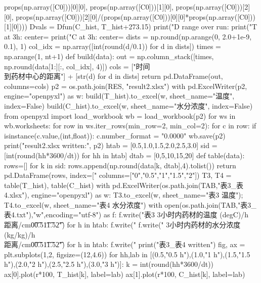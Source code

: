 \begin{codelisting}
    props(np.array([C0]))[0][0], props(np.array([C0]))[1][0], props(np.array([C0]))[2][0],
    props(np.array([C0]))[2][0]/(props(np.array([C0]))[0][0]*props(np.array([C0]))[1][0])))
Dvals = Dfun(C_hist, T_hist+273.15)
print("D range over run: %
print("T at 3h: center=%
print("C at 3h: center=%
dists = np.round(np.arange(0, 2.0+1e-9, 0.1), 1)
col_idx = np.array([int(round(d/0.1)) for d in dists])
times = np.arange(1, nt+1)
def build(data):
    out = np.column_stack([times, np.round(data[1:][:, col_idx], 4)])
    cols = ["时间\\到药材中心的距离"] + [str(d) for d in dists]
    return pd.DataFrame(out, columns=cols)
p2 = os.path.join(RES, "result2.xlsx")
with pd.ExcelWriter(p2, engine="openpyxl") as w:
    build(T_hist).to_excel(w, sheet_name="温度", index=False)
    build(C_hist).to_excel(w, sheet_name="水分浓度", index=False)
from openpyxl import load_workbook
wb = load_workbook(p2)
for ws in wb.worksheets:
    for row in ws.iter_rows(min_row=2, min_col=2):
        for c in row:
            if isinstance(c.value,(int,float)): c.number_format = "0.0000"
wb.save(p2)
print("result2.xlsx written:", p2)
htab = [0.5,1.0,1.5,2.0,2.5,3.0]
sid  = [int(round(hh*3600/dt)) for hh in htab]
dtab = [0,5,10,15,20]
def table(data):
    rows=[]
    for k in sid:
        rows.append(np.round(data[k, dtab],4).tolist())
    return pd.DataFrame(rows, index=["%
                        columns=["0","0.5","1","1.5","2"])
T3, T4 = table(T_hist), table(C_hist)
with pd.ExcelWriter(os.path.join(TAB,"表3_表4.xlsx"), engine="openpyxl") as w:
    T3.to_excel(w, sheet_name="表3 温度"); T4.to_excel(w, sheet_name="表4 水分浓度")
with open(os.path.join(TAB,"表3_表4.txt"),"w",encoding="utf-8") as f:
    f.write("表3 3小时内药材的温度 (degC)/h\\距离/cm\t0\t0.5\t1\t1.5\t2\n")
    for h in htab: f.write("%
    f.write(" 3小时内药材的水分浓度 (kg/kg)/h\\距离/cm\t0\t0.5\t1\t1.5\t2\n")
    for h in htab: f.write("%
print("表3_表4 written")
fig, ax = plt.subplots(1,2, figsize=(12,4.6))
for hh,lab in [(0.5,"0.5 h"),(1.0,"1 h"),(1.5,"1.5 h"),(2.0,"2 h"),(2.5,"2.5 h"),(3.0,"3 h")]:
    k = int(round(hh*3600/dt))
    ax[0].plot(r*100, T_hist[k], label=lab)
    ax[1].plot(r*100, C_hist[k], label=lab)

\end{codelisting}
